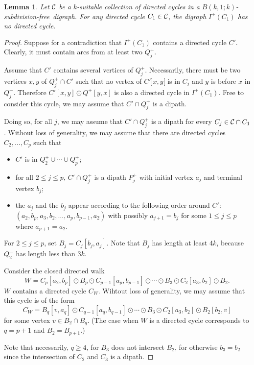 \documentclass[utf8,10pt]{article}
\theoremstyle{plain}
\newtheorem{lemma}[theorem]{Lemma}
\theoremstyle{definition}
\theoremstyle{remark}
\newcommand{\free}{subdivision-free}
\begin{document}
\begin{lemma}\label{lem:no-dicycle}
Let ${\cal C}$ be a $k$-suitable collection of directed cycles in a $B(k,1;k)$-\free\ digraph. For any directed cycle $C_1\in {\cal C}$, the digraph
$I^+(C_1)$ has no directed cycle.  
\end{lemma}

\begin{proof}

Suppose for a contradiction that $I^+(C_1)$  contains a directed cycle $C'$.
Clearly, it must contain arcs from at least two $Q^+_j$.



Assume that $C'$ contains several vertices of $Q^+_j$.
Necessarily, there must be two vertices $x,y$ of $Q^+_j\cap C'$ such that no vertex of $C']x,y[$ is in $C_j$ and  $y$ is before $x$ in $Q^+_j$.
Therefore $C'[x,y]\odot Q^+[y,x]$ is also a directed cycle in $I^+(C_1)$. Free to consider this cycle,
we may assume that $C'\cap Q^+_j$ is a dipath.

Doing so, for all $j$, we may assume that $C'\cap Q^+_j$ is a dipath  for every $C_j\in {\cal C}\cap C_1$.
Without loss of generality, we may assume that there are directed cycles $C_2, \dots , C_p$ such that
\begin{itemize}
\item $C'$ is in $Q^+_2\cup \cdots  \cup Q^+_p$;
\item for all $2\leq j\leq p$, $C'\cap Q^+_j$ is a dipath $P^+_j$ with initial vertex $a_j$ and terminal vertex $b_j$;
\item the $a_j$ and the $b_j$ appear according to the following order around $C'$: $(a_2, b_p, a_3, b_2, \dots ,   a_p, b_{p-1}, a_2)$ with possibly $a_{j+1}=b_j$ for some $1\leq j \leq p$ where $a_{p+1}=a_2$.
\end{itemize}
For $2\leq j\leq p$, set $B_j=C_j[b_j, a_j]$. Note that $B_j$ has length at least $4k$, because $Q^+_2$ has length less than $3k$.


Consider the closed directed walk $$W=C_p[a_2,b_p]\odot B_p \odot C_{p-1}[a_p, b_{p-1}] \odot  \cdots  \odot  B_3\odot C_2[a_3, b_2]\odot B_2.$$
$W$ contains a directed cycle $C_W$. Wihtout loss of generality, we may assume that this cycle is of the form
$$C_W=B_q[v, a_q] \odot C_{q-1}[a_q, b_{q-1}] \odot  \cdots  \odot  B_3\odot C_2[a_3, b_2]\odot B_2[b_2, v]$$
for some vertex $v\in B_2\cap B_q$. (The case when $W$ is a directed cycle corresponds to $q=p+1$ and $B_2=B_{p+1}$.)

Note that necessarily, $q\geq 4$, for $B_3$ does not intersect $B_2$, for otherwise $b_3=b_2$ since the intersection of $C_2$ and $C_3$ is a dipath.


\end{proof}
\end{document}
